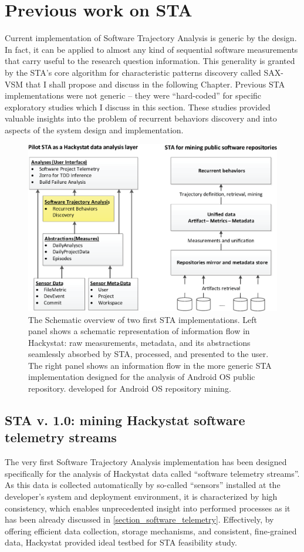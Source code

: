 \section{Previous work on STA}
Current implementation of Software Trajectory Analysis is generic by the design. In fact, it can be applied 
to almost any kind of sequential software measurements that carry useful to the research question information. 
This generality is granted by the STA's core algorithm for characteristic patterns discovery called SAX-VSM 
that I shall propose and discuss in the following Chapter. 
Previous STA implementations were not generic -- they were ``hard-coded'' for specific exploratory studies 
which I discuss in this section. These studies provided valuable insights into the problem of recurrent 
behaviors discovery and into aspects of the system design and implementation.

\begin{figure}[t]
   \centering
   \includegraphics[width=150mm]{figures/STA12-schema-draft.eps}
   \caption{The Schematic overview of two first STA implementations. 
   Left panel shows a schematic representation of information flow in Hackystat: raw measurements, metadata, and its 
   abstractions seamlessly absorbed by STA, processed, and presented to the user.
   The right panel shows an information flow in the more generic STA implementation designed for the analysis of 
   Android OS public repository. developed for Android OS repository mining.}
   \label{fig:STA12-schema}
\end{figure}

\subsection{STA v. 1.0: mining Hackystat software telemetry streams}
The very first Software Trajectory Analysis implementation has been designed specifically for the analysis of Hackystat 
data called ``software telemetry streams''. As this data is collected automatically by so-called ``sensors'' installed 
at the developer's system and deployment environment, it is characterized by high consistency, which enables 
unprecedented insight into performed processes as it has been already discussed in \ref{section_software_telemetry}. 
Effectively, by offering efficient data collection, storage mechanisms, and consistent, fine-grained data, 
Hackystat provided ideal testbed for STA feasibility study.

